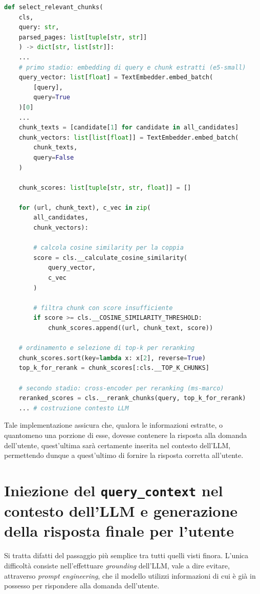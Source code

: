 \begin{lstlisting}[language=Python, caption={Codice Python che implementa la fase di two-stage chunk retrieval.}, label={lst:chunk_ranking}]
def select_relevant_chunks(
    cls, 
    query: str, 
    parsed_pages: list[tuple[str, str]]
    ) -> dict[str, list[str]]:
    ...
    # primo stadio: embedding di query e chunk estratti (e5-small)
    query_vector: list[float] = TextEmbedder.embed_batch(
        [query], 
        query=True
    )[0]
    ...
    chunk_texts = [candidate[1] for candidate in all_candidates]
    chunk_vectors: list[list[float]] = TextEmbedder.embed_batch(
        chunk_texts, 
        query=False
    )

    chunk_scores: list[tuple[str, str, float]] = [] 

    for (url, chunk_text), c_vec in zip(
        all_candidates, 
        chunk_vectors):

        # calcola cosine similarity per la coppia
        score = cls.__calculate_cosine_similarity(
            query_vector, 
            c_vec
        )
        
        # filtra chunk con score insufficiente
        if score >= cls.__COSINE_SIMILARITY_THRESHOLD: 
            chunk_scores.append((url, chunk_text, score)) 
            
    # ordinamento e selezione di top-k per reranking
    chunk_scores.sort(key=lambda x: x[2], reverse=True) 
    top_k_for_rerank = chunk_scores[:cls.__TOP_K_CHUNKS]

    # secondo stadio: cross-encoder per reranking (ms-marco)
    reranked_scores = cls.__rerank_chunks(query, top_k_for_rerank)
    ... # costruzione contesto LLM

\end{lstlisting}

Tale implementazione assicura che, qualora le informazioni estratte, o quantomeno una porzione di esse, dovesse contenere la risposta alla domanda dell'utente, quest'ultima sarà certamente inserita nel contesto dell'LLM, permettendo dunque a quest'ultimo di fornire la risposta corretta all'utente.

\section{Iniezione del \texttt{query\_context} nel contesto dell'LLM e generazione della risposta finale per l'utente}
Si tratta difatti del passaggio più semplice tra tutti quelli visti finora. L'unica difficoltà consiste nell'effettuare \textit{grounding} dell'LLM, vale a dire evitare, attraverso \textit{prompt engineering}, che il modello utilizzi informazioni di cui è già in possesso per rispondere alla domanda dell'utente.

